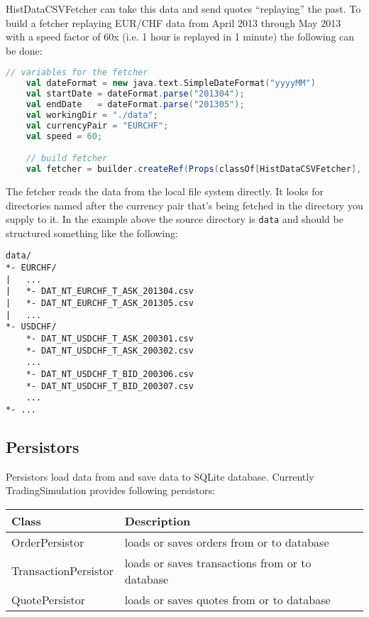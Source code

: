 HistDataCSVFetcher can take this data and send quotes ``replaying'' the past. To build a fetcher replaying EUR/CHF data from April 2013 through May 2013 with a speed factor of 60x (i.e. 1 hour is replayed in 1 minute) the following can be done:

\begin{lstlisting}[language=Scala]
    // variables for the fetcher
    val dateFormat = new java.text.SimpleDateFormat("yyyyMM")
    val startDate = dateFormat.parse("201304");
    val endDate   = dateFormat.parse("201305");
    val workingDir = "./data";
    val currencyPair = "EURCHF";
    val speed = 60;

    // build fetcher
    val fetcher = builder.createRef(Props(classOf[HistDataCSVFetcher], workingDir, currencyPair, startDate, endDate, speed),"HistFetcher")
\end{lstlisting}

The fetcher reads the data from the local file system directly. It looks for directories named after the currency pair that's being fetched in the directory you supply to it. In the example above the source directory is \lstinline|data| and should be structured something like the following:

\begin{lstlisting}
data/
*- EURCHF/
|   ...
|   *- DAT_NT_EURCHF_T_ASK_201304.csv
|   *- DAT_NT_EURCHF_T_ASK_201305.csv
|   ...
*- USDCHF/
    *- DAT_NT_USDCHF_T_ASK_200301.csv
    *- DAT_NT_USDCHF_T_ASK_200302.csv
    ...
    *- DAT_NT_USDCHF_T_BID_200306.csv
    *- DAT_NT_USDCHF_T_BID_200307.csv
    ...
*- ...
\end{lstlisting}

\subsection{Persistors}

Persistors load data from and save data to SQLite database. Currently TradingSimulation provides following persistors:

\noindent
\begin{tabularx}{\textwidth}{|l|X|}
  \hline
  Class & Description  \\
  \hline
  OrderPersistor & loads or saves orders from or to database \\
  \hline
  TransactionPersistor  & loads or saves transactions from or to database  \\
  \hline
  QuotePersistor & loads or saves quotes from or to database  \\
  \hline
\end{tabularx}\\[0.3cm]

